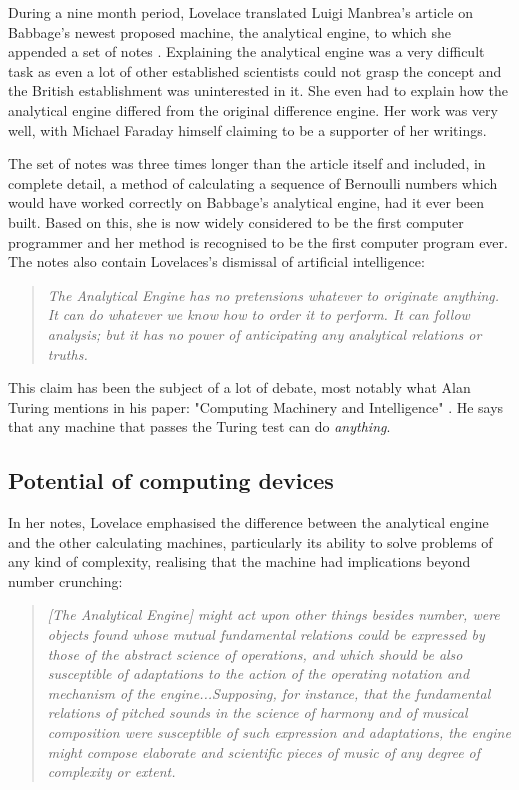 \documentclass{article}
\begin{document}
\vspace{0.3cm}

During a nine month period, Lovelace translated Luigi Manbrea's article on Babbage's newest proposed machine, the analytical engine, to which she appended a set of notes \cite{Sketch}. Explaining the analytical engine was a very difficult task as even a lot of other established scientists could not grasp the concept and the British establishment was uninterested in it. She even had to explain how the analytical engine differed from the original difference engine. Her work was very well, with Michael Faraday himself claiming to be a supporter of her writings.

\vspace{0.3cm}

The set of notes was three times longer than the article itself and included, in complete detail, a method of calculating a sequence of Bernoulli numbers which would have worked correctly on Babbage's analytical engine, had it ever been built. Based on this, she is now widely considered to be the first computer programmer and her method is recognised to be the first computer program ever. The notes also contain Lovelaces's dismissal of artificial intelligence:
\begin{quote}
    \textit{
        The Analytical Engine has no pretensions whatever to originate anything. It can do whatever we know how to order it to perform. It can follow analysis; but it has no power of anticipating any analytical relations or truths.
    }
\end{quote}
This claim has been the subject of a lot of debate, most notably what Alan Turing mentions in his paper: "Computing Machinery and Intelligence" \cite{AlanTuring}. He says that any machine that passes the Turing test can do \textit{anything}.

\newpage

\subsection{Potential of computing devices}

In her notes, Lovelace emphasised the difference between the analytical engine and the other calculating machines, particularly its ability to solve problems of any kind of complexity, realising that the machine had implications beyond number crunching: \cite{Sketch}
\begin{quote}
    \textit{
        [The Analytical Engine] might act upon other things besides number, were objects found whose mutual fundamental relations could be expressed by those of the abstract science of operations, and which should be also susceptible of adaptations to the action of the operating notation and mechanism of the engine...Supposing, for instance, that the fundamental relations of pitched sounds in the science of harmony and of musical composition were susceptible of such expression and adaptations, the engine might compose elaborate and scientific pieces of music of any degree of complexity or extent.
    }
\end{quote}
\end{document}
